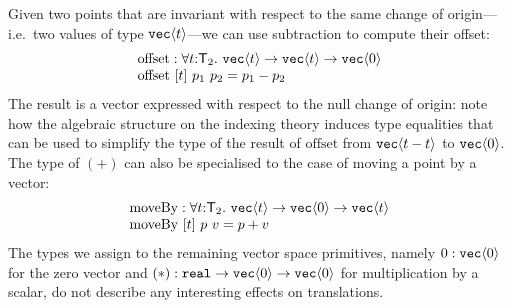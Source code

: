 Given two points that are invariant with respect to the same change of
origin---i.e.~two values of type $\textup{\texttt{vec}}\langle t \rangle$---we can use
subtraction to compute their offset:
\begin{displaymath}
  \begin{array}{l}
    \mathrm{offset} : \forall t
    \mathord:\mathsf{T}_2.\ \textup{\texttt{vec}}\langle t \rangle \to \textup{\texttt{vec}}\langle t \rangle \to
    \textup{\texttt{vec}}\langle 0 \rangle \\ \mathrm{offset}\ [t]\ p_1\ p_2 = p_1 - p_2
  \end{array}
\end{displaymath}
The result is a vector expressed with respect to the null change of
origin: note how the algebraic structure on the indexing theory
induces type equalities that can be used to simplify the type of the
result of $\mathrm{offset}$ from $\textup{\texttt{vec}}\langle t-t \rangle$ to
$\textup{\texttt{vec}}\langle 0 \rangle$. The type of $(+)$ can also be specialised to the
case of moving a point by a vector:
\begin{displaymath}
  \begin{array}{l}
    \mathrm{moveBy} : \forall t
    \mathord:\mathsf{T}_2.\ \textup{\texttt{vec}}\langle t \rangle \to \textup{\texttt{vec}}\langle 0 \rangle \to
    \textup{\texttt{vec}}\langle t \rangle \\ \mathrm{moveBy}\ [t]\ p\ v = p + v
  \end{array}
\end{displaymath}
The types we assign to the remaining vector space primitives, namely
$\mathrm{0} : \textup{\texttt{vec}}\langle 0 \rangle$ for
the zero vector and $(*) : \textup{\texttt{real}} \to
    \textup{\texttt{vec}}\langle 0 \rangle \to \textup{\texttt{vec}}\langle 0 \rangle$ for
multiplication by a scalar, do not describe any
interesting effects on translations.


